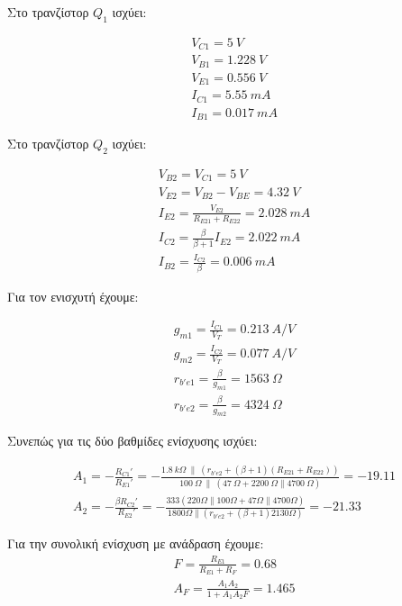 \documentclass[11pt,a4paper,twoside,onecolumn,openright,final]{memoir}
\begin{document}
Στο τρανζίστορ \(Q_1\) ισχύει:

\begin{gather*}
    V_{C1} = 5\ V \\
    V_{B1} = 1.228 \ V \\
    V_{E1} = 0.556 \ V \\
    I_{C1} = 5.55 \ mA \\
    I_{B1} = 0.017 \ mA
\end{gather*}

Στο τρανζίστορ \(Q_2\) ισχύει:

\begin{gather*}
    V_{B2} = V_{C1} = 5\ V \\
    V_{E2} = V_{B2} - V_{BE} = 4.32 \ V \\
    I_{E2} = \frac{V_{E2}}{R_{E21} + R_{E22}} = 2.028 \ mA \\
    I_{C2} = \frac{\beta}{\beta + 1}I_{E2} = 2.022 \ mA \\
    I_{B2} = \frac{I_{C2}}{\beta} = 0.006 \ mA
\end{gather*}

Για τον ενισχυτή έχουμε:

\begin{gather*}
    g_{m1} = \frac{I_{C1}}{V_T} = 0.213 \ A/V \\
    g_{m2} = \frac{I_{C2}}{V_T} = 0.077 \ A/V \\
    r_{b'e1} = \frac{\beta}{g_{m1}} = 1563 \ \Omega \\
    r_{b'e2} = \frac{\beta}{g_{m2}} = 4324 \ \Omega
\end{gather*}

Συνεπώς για τις δύο βαθμίδες ενίσχυσης ισχύει:

\begin{gather*}
    A_1 = - \frac{R_{C1}'}{R_{E1}'} = - \frac{1.8\ k\Omega \ \| \ (r_{b'e2}+(\beta + 1)(R_{E21}+R_{E22}))}{100 \ \Omega \ \| \ (47 \ \Omega + 2200 \ \Omega \| 4700 \ \Omega)} = -19.11 \\
    A_2 = - \frac{\beta R_{C2}'}{R_{E2}'} = -\frac{333 (220 \Omega\| 100\Omega+47\Omega\|4700\Omega)}{1800\Omega \| (r_{b'e2}+(\beta+1)2130\Omega)} = -21.33
\end{gather*}

Για την συνολική ενίσχυση με ανάδραση έχουμε:
\begin{gather*}
    F = \frac{R_{E1}}{R_{E1}+R_F} = 0.68 \\
    A_F = \frac{A_1A_2}{1+A_1A_2F} = 1.465
\end{gather*}
\end{document}
